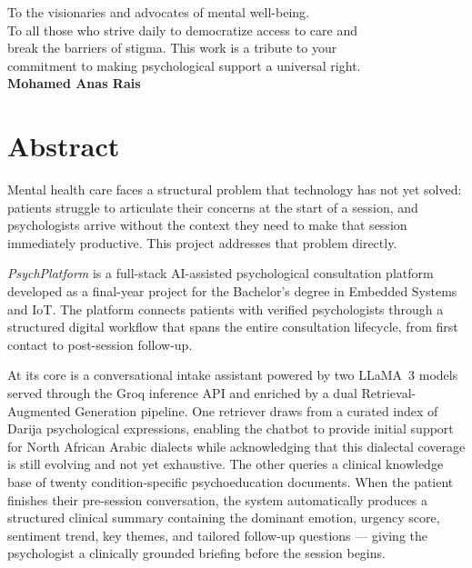 \documentclass[a4paper,12pt]{report}
\begin{document}
\begin{center}
{        To the visionaries and advocates of mental well-being.\\
        To all those who strive daily to democratize access to care and \\
        break the barriers of stigma. This work is a tribute to your \\
        commitment to making psychological support a universal right. \\[1.5em]
    }
        \textbf{Mohamed Anas Rais}
    
\end{center}


\chapter*{Abstract}
{}

Mental health care faces a structural problem that technology has not yet solved:
patients struggle to articulate their concerns at the start of a session, and
psychologists arrive without the context they need to make that session
immediately productive. This project addresses that problem directly.

\emph{PsychPlatform} is a full-stack AI-assisted psychological consultation
platform developed as a final-year project for the Bachelor's degree in Embedded
Systems and IoT. The platform connects patients with verified psychologists
through a structured digital workflow that spans the entire consultation
lifecycle, from first contact to post-session follow-up.

At its core is a conversational intake assistant powered by two LLaMA~3 models
served through the Groq inference API and enriched by a dual
Retrieval-Augmented Generation pipeline. One retriever draws from a curated
index of Darija psychological expressions, enabling the chatbot to provide initial
support for North African Arabic dialects while acknowledging that this dialectal
coverage is still evolving and not yet exhaustive. The other queries a clinical
knowledge base of twenty condition-specific psychoeducation documents. When the
patient finishes their pre-session conversation, the system automatically
produces a structured clinical summary containing the dominant emotion, urgency
score, sentiment trend, key themes, and tailored follow-up questions --- giving
the psychologist a clinically grounded briefing before the session begins.
\end{document}

